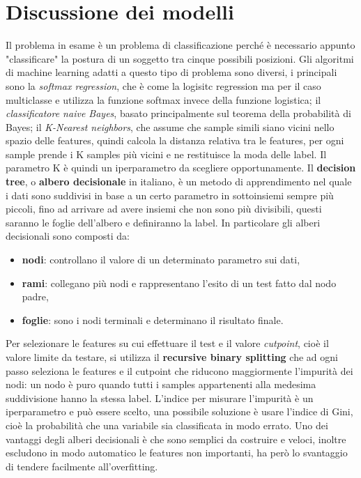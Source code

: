 \section{Discussione dei modelli}\label{sec:modelli}
Il problema in esame è un problema di classificazione perché è necessario appunto "classificare" la postura di un soggetto tra cinque possibili posizioni. Gli algoritmi di machine learning adatti a questo tipo di problema sono diversi, i principali sono la \textit{softmax regression},  che è come la logisitc regression ma per il caso multiclasse e utilizza la funzione softmax invece della funzione logistica; il \textit{classificatore naive Bayes}, basato principalmente sul teorema della probabilità di Bayes; il \textit{K-Nearest neighbors}, che assume che sample simili siano vicini nello spazio delle features, quindi calcola la distanza relativa tra le features, per ogni sample prende i K samples più vicini e ne restituisce la moda delle label. Il parametro K è quindi un iperparametro da scegliere opportunamente. Il \textbf{decision tree}, o \textbf{albero decisionale} in italiano, è un metodo di apprendimento nel quale i dati sono suddivisi in base a un certo parametro in sottoinsiemi sempre più piccoli, fino ad arrivare ad avere insiemi che non sono più divisibili, questi saranno le foglie dell'albero e definiranno la label. In particolare gli alberi decisionali sono composti da:
\begin{itemize}
\item \textbf{nodi}: controllano il valore di un determinato parametro sui dati,
\item \textbf{rami}: collegano più nodi e rappresentano l'esito di un test fatto dal nodo padre,
\item \textbf{foglie}: sono i nodi terminali e determinano il risultato finale.
\end{itemize}

Per selezionare le features su cui effettuare il test e il valore \textit{cutpoint}, cioè il valore limite da testare, si utilizza il \textbf{recursive binary splitting} che ad ogni passo seleziona le features e il cutpoint che riducono maggiormente l'impurità dei nodi: un nodo è puro quando tutti i samples appartenenti alla medesima suddivisione hanno la stessa label.  L'indice per misurare l'impurità è un iperparametro e può essere scelto, una possibile soluzione è usare l'indice di Gini, cioè la probabilità che una variabile sia classificata in modo errato. Uno dei vantaggi degli alberi decisionali è che sono semplici da costruire e veloci, inoltre escludono in modo automatico le features non importanti, ha però lo svantaggio di tendere facilmente all'overfitting. 

